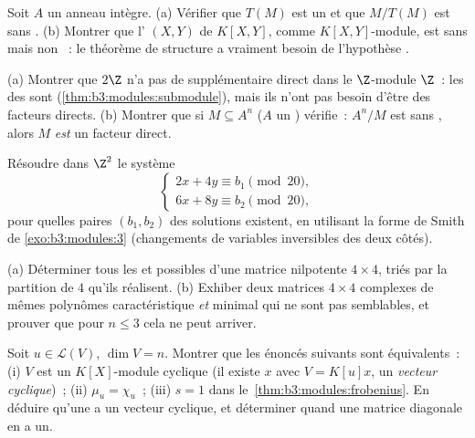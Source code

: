 \begin{exercise}[$\star\star$]\label{exo:b3:modules:5}
Soit $A$ un anneau intègre. (a) Vérifier que $T(M)$ est un
 et que $M/T(M)$ est sans . (b) Montrer que
l' $(X, Y)$ de $K[X,Y]$, comme $K[X,Y]$-module, est sans
 mais non ~: le théorème de structure a vraiment
besoin de l'hypothèse .
\end{exercise}

\begin{exercise}[$\star\star$]\label{exo:b3:modules:6}
(a) Montrer que $2\Z$ n'a pas de supplémentaire direct dans le
$\Z$-module $\Z$~: les  des  sont
 (\cref{thm:b3:modules:submodule}), mais ils n'ont pas
besoin d'être des facteurs directs. (b) Montrer que si $M
\subseteq A^n$ ($A$ un ) vérifie~: $A^n/M$ est sans ,
alors $M$ \emph{est} un facteur direct.
\end{exercise}

\begin{exercise}[$\star\star$]\label{exo:b3:modules:7}
Résoudre dans $\Z^2$ le système
\[
\begin{cases}
2x + 4y \equiv b_1 \pmod{20},\\
6x + 8y \equiv b_2 \pmod{20},
\end{cases}
\]
pour quelles paires $(b_1, b_2)$ des solutions existent, en
utilisant la forme de Smith de \cref{exo:b3:modules:3}
(changements de variables inversibles des deux côtés).
\end{exercise}

\begin{exercise}[$\star\star$]\label{exo:b3:modules:8}
(a) Déterminer tous les  et  possibles d'une matrice nilpotente $4 \times 4$, triés
par la partition de $4$ qu'ils réalisent.
(b) Exhiber deux matrices $4\times4$ complexes de mêmes
polynômes caractéristique \emph{et} minimal qui ne sont pas
semblables, et prouver que pour $n \leq 3$ cela ne peut
arriver.
\end{exercise}

\begin{exercise}[$\star\star\star$]\label{exo:b3:modules:9}
Soit $u \in \mathcal L(V)$, $\dim V = n$. Montrer que les
énoncés suivants sont équivalents~: (i) $V$ est un
$K[X]$-module cyclique (il existe $x$ avec $V = K[u]x$, un
\emph{vecteur cyclique})~; (ii) $\mu_u = \chi_u$~; (iii) $s =
1$ dans le~\cref{thm:b3:modules:frobenius}. En déduire qu'une
 a un vecteur cyclique, et déterminer quand une
matrice diagonale en a un.
\end{exercise}

